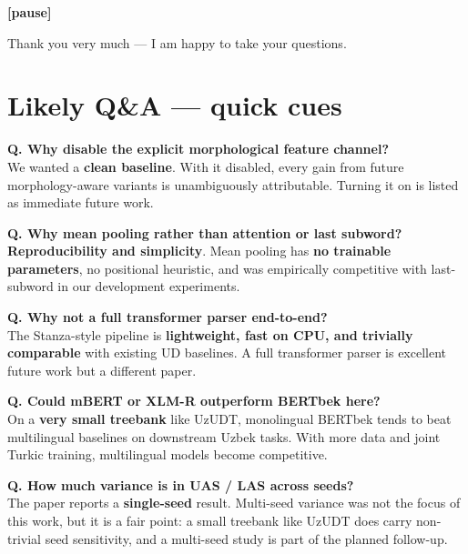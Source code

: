 \documentclass[12pt,a4paper]{article}
\newcommand{\pause}{\par\vspace{0.4em}\textbf{[pause]}\par}
\begin{document}
\pause

Thank you very much --- I am happy to take your questions.

\newpage
\section*{Likely Q\&A --- quick cues}

\noindent\textbf{Q. Why disable the explicit morphological feature channel?}\\
We wanted a \textbf{clean baseline}. With it disabled, every gain from
future morphology-aware variants is unambiguously attributable. Turning
it on is listed as immediate future work.

\vspace{0.4em}
\noindent\textbf{Q. Why mean pooling rather than attention or last subword?}\\
\textbf{Reproducibility and simplicity}. Mean pooling has \textbf{no
trainable parameters}, no positional heuristic, and was empirically
competitive with last-subword in our development experiments.

\vspace{0.4em}
\noindent\textbf{Q. Why not a full transformer parser end-to-end?}\\
The Stanza-style pipeline is \textbf{lightweight, fast on CPU, and
trivially comparable} with existing UD baselines. A full transformer
parser is excellent future work but a different paper.

\vspace{0.4em}
\noindent\textbf{Q. Could mBERT or XLM-R outperform BERTbek here?}\\
On a \textbf{very small treebank} like UzUDT, monolingual BERTbek tends
to beat multilingual baselines on downstream Uzbek tasks. With more
data and joint Turkic training, multilingual models become competitive.

\vspace{0.4em}
\noindent\textbf{Q. How much variance is in UAS / LAS across seeds?}\\
The paper reports a \textbf{single-seed} result. Multi-seed variance was
not the focus of this work, but it is a fair point: a small treebank
like UzUDT does carry non-trivial seed sensitivity, and a multi-seed
study is part of the planned follow-up.
\end{document}

